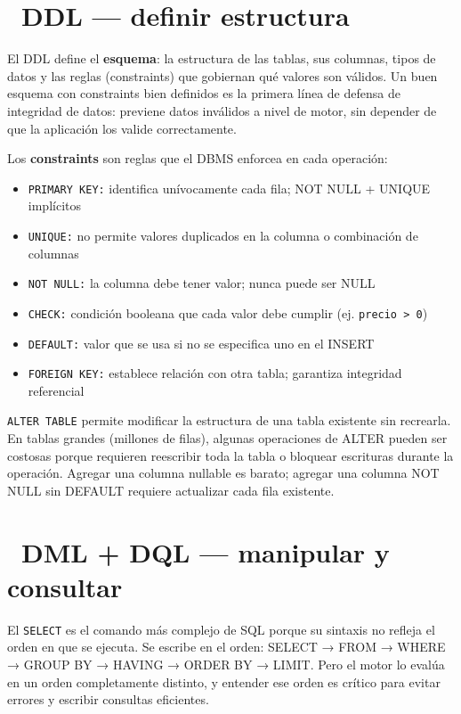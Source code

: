\section[DDL --- definir estructura]{~DDL --- definir estructura}

El DDL define el \textbf{esquema}: la estructura de las tablas, sus columnas, tipos de datos y las reglas (constraints) que gobiernan qué valores son válidos.
Un buen esquema con constraints bien definidos es la primera línea de defensa de integridad de datos: previene datos inválidos a nivel de motor, sin depender de que la aplicación los valide correctamente.

Los \textbf{constraints} son reglas que el DBMS enforcea en cada operación:
\begin{itemize}
  \item \texttt{PRIMARY KEY:} identifica unívocamente cada fila; NOT NULL + UNIQUE implícitos
  \item \texttt{UNIQUE:} no permite valores duplicados en la columna o combinación de columnas
  \item \texttt{NOT NULL:} la columna debe tener valor; nunca puede ser NULL
  \item \texttt{CHECK:} condición booleana que cada valor debe cumplir (ej. \texttt{precio > 0})
  \item \texttt{DEFAULT:} valor que se usa si no se especifica uno en el INSERT
  \item \texttt{FOREIGN KEY:} establece relación con otra tabla; garantiza integridad referencial
\end{itemize}

\texttt{ALTER TABLE} permite modificar la estructura de una tabla existente sin recrearla.
En tablas grandes (millones de filas), algunas operaciones de ALTER pueden ser costosas porque requieren reescribir toda la tabla o bloquear escrituras durante la operación.
Agregar una columna nullable es barato; agregar una columna NOT NULL sin DEFAULT requiere actualizar cada fila existente.

\section[DML + DQL --- manipular y consultar]{~DML + DQL --- manipular y consultar}

El \texttt{SELECT} es el comando más complejo de SQL porque su sintaxis no refleja el orden en que se ejecuta.
Se escribe en el orden: SELECT → FROM → WHERE → GROUP BY → HAVING → ORDER BY → LIMIT.
Pero el motor lo evalúa en un orden completamente distinto, y entender ese orden es crítico para evitar errores y escribir consultas eficientes.

